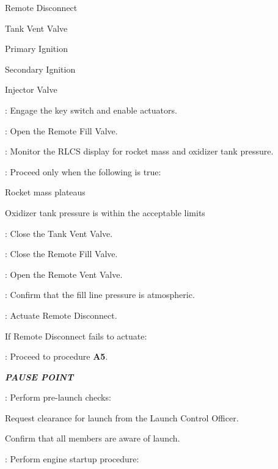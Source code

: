 \begin{checklist}
\begin{checklist}
        \item Remote Disconnect
        \item Tank Vent Valve
        \item Primary Ignition
        \item Secondary Ignition
        \item Injector Valve
    \end{checklist}
    \item \control{}: Engage the key switch and enable actuators.
    \item \control{}: Open the Remote Fill Valve.
    \item \control{}: Monitor the RLCS display for rocket mass and oxidizer tank pressure.
    \item \ops{}: Proceed only when the following is true:
    \begin{checklist}
        \item Rocket mass plateaus
        \item Oxidizer tank pressure is within the acceptable limits
    \end{checklist}
    \item \control{}: Close the Tank Vent Valve.
    \item \control{}: Close the Remote Fill Valve.
    \item \control{}: Open the Remote Vent Valve.
    \item \control{}: Confirm that the fill line pressure is atmospheric.
    \item \control{}: Actuate Remote Disconnect.
     \begin{checklist}[label=$\bullet$]
        \item If Remote Disconnect fails to actuate:
        \begin{checklist}
            \item \ops{}: Proceed to procedure \textbf{A5}.
        \end{checklist}
    \end{checklist}
    \item \textbf{\textit{PAUSE POINT}}
    \item \ops: Perform pre-launch checks:
    \begin{checklist}
        \item Request clearance for launch from the Launch Control Officer.
        \item Confirm that all members are aware of launch.
    \end{checklist}    
    \item \primary{}: Perform engine startup procedure:

\end{checklist}
